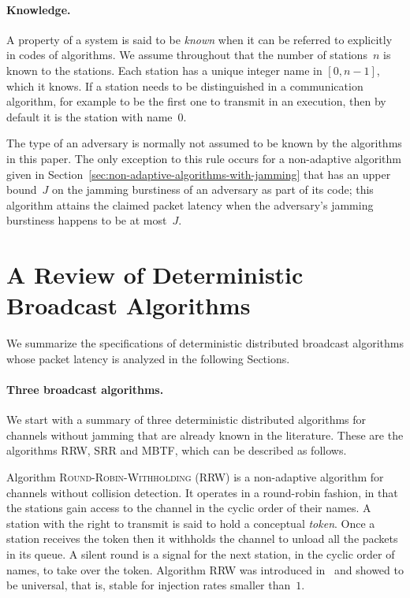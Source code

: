 \documentclass[11pt]{article}
\newcommand{\BBB}{\vspace*{-\bigskipamount}}
\newcommand{\Paragraph}[1]{\BBB\paragraph{#1}}
\begin{document}

\Paragraph{Knowledge.}

A property of a system is said to be \emph{known} when it can be referred to explicitly in codes of algorithms.
We assume throughout that the number of stations~$n$ is known to the stations.
Each station has a unique integer name in $[0,n-1]$, which it knows.
If a station needs to be distinguished in a communication algorithm, for example to be the first one to transmit in an execution, then by default it is the station with name~$0$.


The type of an adversary is normally not assumed to be known by the algorithms in this paper.
The only exception to this rule  occurs for a non-adaptive algorithm given in Section~\ref{sec:non-adaptive-algorithms-with-jamming} that has  an upper bound~$J$ on the jamming burstiness of an adversary as part of its code; this algorithm attains the claimed packet latency when the adversary's jamming  burstiness happens to be at most~$J$.
 



\section{A Review of Deterministic Broadcast Algorithms}

\label{sec:review-of-deterministic-broadcast-algorithms}



We summarize the specifications of deterministic distributed broadcast algorithms whose packet latency is analyzed in the following Sections.




\Paragraph{Three broadcast algorithms.}



We start with a summary of three deterministic distributed algorithms for channels without jamming that are already known in the literature.
These are the algorithms \textsc{RRW}, \textsc{SRR} and \textsc{MBTF}, which can be described as follows.


Algorithm \textsc{Round-Robin-Withholding} (\textsc{RRW}) is a  non-adaptive algorithm for channels without collision detection.
It operates in a round-robin fashion, in that the stations gain access to the channel in the cyclic order of their names.
A station with the right to transmit is said to hold a conceptual \emph{token}.
Once a station receives the token then it withholds the channel to unload all the packets in its queue.
A silent round is a signal for the next station, in the cyclic order of names,  to take over the token.
Algorithm \textsc{RRW} was introduced in~\cite{ChlebusKR-TALG12} and showed to be universal, that is, stable for injection rates smaller than~$1$.
\end{document}
